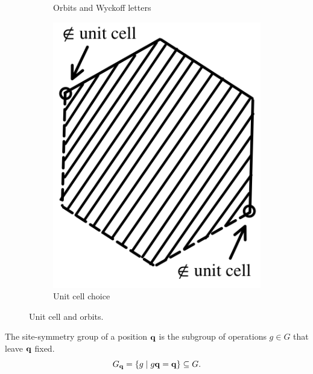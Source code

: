 \begin{figure}[H]
\begin{subfigure}{.3\textwidth}
  \caption{Orbits and Wyckoff letters}
  \label{fig:unitcell_orbitsymbols}
\end{subfigure}
\hfill
\begin{subfigure}{.235\textwidth}
  \centering
  \includegraphics[width=\linewidth]{fig/unitcell_limit.png}
  \caption{Unit cell choice}
  \label{fig:unitcell_limit}
\end{subfigure}
\caption{Unit cell and orbits.}
\label{fig:unitcell_orbits}
\end{figure}


\begin{definition} \label{def:sitesym}
The site-symmetry group of a position ${\vb{q}}$ is the subgroup of operations $g \in G$ that leave ${\vb{q}}$ fixed.
\begin{equation} \label{eq:site-symmetry_def}
G_{\vb{q}} = \{g \mid g {\vb{q}} = {\vb{q}}\} \subseteq G.
\end{equation}
\end{definition}


